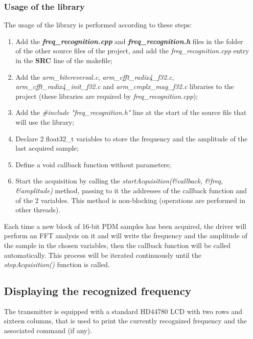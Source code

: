 \subsubsection{Usage of the library}
The usage of the library is performed according to these steps:
\begin{enumerate}
	\item Add the \textbf{\textit{freq\_recognition.cpp}} and \textbf{\textit{freq\_recognition.h}} files in the folder of the other source files of the project, and add the \textit{freq\_recognition.cpp} entry in the \textbf{SRC} line of the makefile;
	\item Add the \textit{arm\_bitereversal.c}, \textit{arm\_cfft\_radix4\_f32.c}, \textit{arm\_cfft\_radix4\_init\_f32.c} and \textit{arm\_cmplx\_mag\_f32.c} libraries to the project (these libraries are required by \textit{freq\_recognition.cpp});
	\item Add the \textit{\#include "freq\_recognition.h"} line at the start of the source file that will use the library;
	\item Declare 2 float32\_t variables to store the frequency and the amplitude of the last acquired sample;
	\item Define a void callback function without parameters;
	\item Start the acquisition by calling the \textit{startAcquisition(\&callback, \&freq, \&amplitude)} method, passing to it the addresses of the callback function and of the 2 variables. This method is non-blocking (operations are performed in other threads).
\end{enumerate}
Each time a new block of 16-bit PDM samples has been acquired, the driver will perform an FFT analysis on it and will write the frequency and the amplitude of the sample in the chosen variables, then the callback function will be called automatically. This process will be iterated continuously until the \textit{stopAcquisition()} function is called.
\newpage

\subsection{Displaying the recognized frequency}
The transmitter is equipped with a standard HD44780 LCD with two rows and sixteen columns, that is used to print the currently recognized frequency and the associated command (if any).

